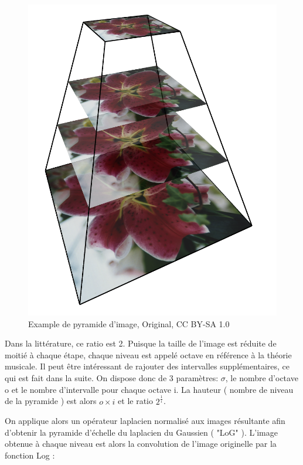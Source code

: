 \documentclass{article}
\begin{document}
	\begin{figure}
		\centering
		\includegraphics[scale=0.1]{img.png}
		\caption{Example de pyramide d'image, Original, CC BY-SA 1.0}
		\label{fig:ex}
	\end{figure}	 

	Dans la littérature, ce ratio est 2. Puisque la taille de l'image est réduite de moitié à chaque étape, chaque niveau est appelé octave en référence à la théorie musicale. Il peut être intéressant de rajouter des intervalles supplémentaires, ce qui est fait dans la suite. 
	On dispose donc de 3 paramètres: $\sigma$, le nombre d'octave o et le nombre d'intervalle pour chaque octave i. La hauteur ( nombre de niveau de la pyramide ) est alors $o \times i$ et le ratio $2^{\frac{1}{i}}$. 

	On applique alors un opérateur laplacien normalisé aux images résultante afin d'obtenir la pyramide d'échelle du laplacien du Gaussien ( "LoG" ). L'image obtenue à chaque niveau est alors la convolution de l'image originelle par la fonction Log :
\end{document}
